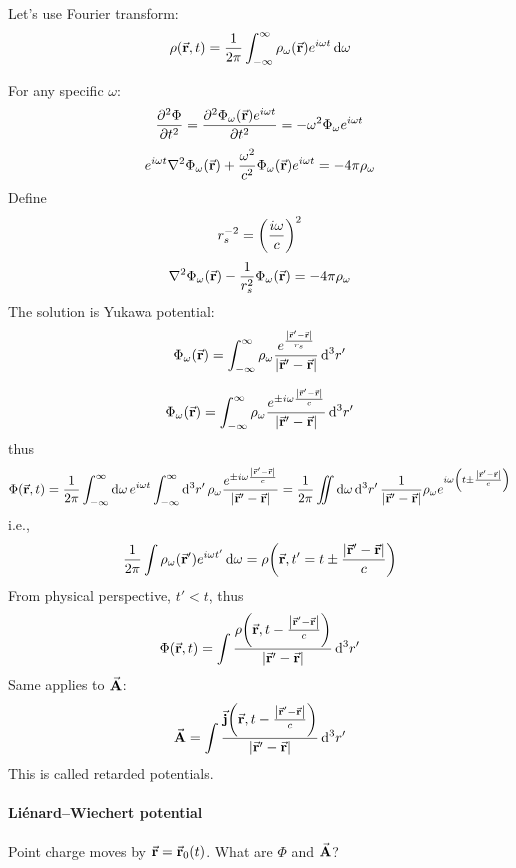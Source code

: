 Let's use Fourier transform:
$$ \rho(\va{r}, t)  = \frac{1}{2\pi} \int_{-\infty}^\infty \rho_\omega(\va{r}) e^{i\omega t} \dd{\omega}$$

For any specific $\omega$:
$$\pdv[2]{\Phi}{t} = \pdv[2]{\Phi_{\omega}(\va{r}) e^{i\omega t}}{t} = -\omega^2 \Phi_{\omega}e^{i\omega t}$$
$$e^{i\omega t} \laplacian{\Phi_{\omega}(\va{r})} + \frac{\omega^2}{c^2} \Phi_{\omega}(\va{r}) e^{i\omega t} = -4\pi \rho_\omega $$
Define 
$$r_s^{-2} = \qty(\frac{i\omega}{c})^2$$
$$\laplacian{\Phi_{\omega}(\va{r})}  - \frac{1}{r_s^2}\Phi_{\omega}(\va{r}) = -4\pi \rho_\omega$$
The solution is Yukawa potential:
$$\Phi_{\omega}(\va{r}) = \int_{-\infty}^\infty \rho_\omega \frac{e^{\frac{\abs{\va{r}' - \va{r}}}{r_s}}}{\abs{\va{r}' - \va{r}}} \dd[3]{r'}$$

$$\Phi_{\omega}(\va{r}) = \int_{-\infty}^\infty \rho_\omega \frac{e^{\pm i\omega\frac{ \abs{\va{r}' - \va{r}}}{c}}}{\abs{\va{r}' - \va{r}}} \dd[3]{r'}$$
thus
$$\Phi(\va{r},t) = \frac{1}{2\pi} \int_{-\infty}^{\infty} \dd{\omega} e^{i\omega t} \int_{-\infty}^{\infty} \dd[3]{r'} \rho_\omega \frac{e^{\pm i\omega\frac{ \abs{\va{r}' - \va{r}}}{c}}}{\abs{\va{r}' - \va{r}}} = \frac{1}{2\pi} \iint \dd{\omega} \dd[3]{r'} \frac{1}{\abs{\va{r}' - \va{r}}} \rho_\omega  e^{ i\omega \qty(t\pm\frac{ \abs{\va{r}' - \va{r}}}{c})}$$
i.e.,
$$\frac{1}{2\pi} \int \rho_{\omega} (\va{r}') e^{i\omega t'} \dd{\omega} = \rho\qty(\va{r}, t' = t\pm \frac{ \abs{\va{r}' - \va{r}}}{c})$$
From physical perspective, $t'<t$, thus
$$\Phi(\va{r},t) = \int \frac{\rho\qty(\va{r}, t - \frac{ \abs{\va{r}' - \va{r}}}{c})}{ \abs{\va{r}' - \va{r}}} \dd[3]{r'}$$ 
Same applies to $\va{A}$:
$$\va{A} = \int \frac{\va{j}\qty(\va{r}, t - \frac{ \abs{\va{r}' - \va{r}}}{c})}{ \abs{\va{r}' - \va{r}}} \dd[3]{r'}$$
This is called retarded potentials.
\paragraph{Li\'{e}nard–Wiechert potential }
Point charge moves by $\va{r} = \va{r}_0(t)$. What are $\Phi$ and $\va{A}$?
